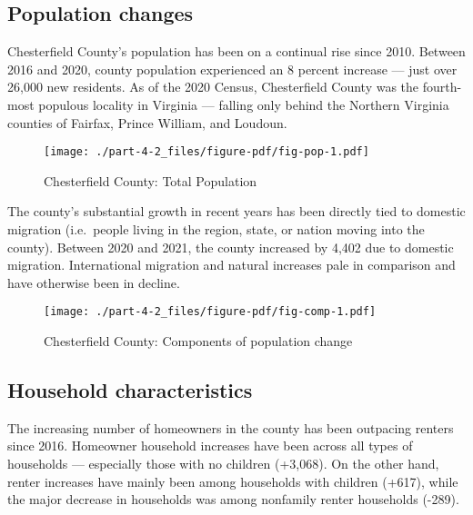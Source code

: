 \documentclass[
  letterpaper,
  DIV=11,
  numbers=noendperiod]{scrreprt}
\begin{document}
\hypertarget{population-changes-1}{%
\subsection{Population changes}\label{population-changes-1}}

Chesterfield County's population has been on a continual rise since
2010. Between 2016 and 2020, county population experienced an 8 percent
increase --- just over 26,000 new residents. As of the 2020 Census,
Chesterfield County was the fourth-most populous locality in Virginia
--- falling only behind the Northern Virginia counties of Fairfax,
Prince William, and Loudoun.

\begin{figure}

{\centering \texttt{[image: ./part-4-2\_files/figure-pdf/fig-pop-1.pdf]}

}

\caption{\label{fig-pop}Chesterfield County: Total Population}

\end{figure}

The county's substantial growth in recent years has been directly tied
to domestic migration (i.e.~people living in the region, state, or
nation moving into the county). Between 2020 and 2021, the county
increased by 4,402 due to domestic migration. International migration
and natural increases pale in comparison and have otherwise been in
decline.

\begin{figure}

{\centering \texttt{[image: ./part-4-2\_files/figure-pdf/fig-comp-1.pdf]}

}

\caption{\label{fig-comp}Chesterfield County: Components of population
change}

\end{figure}

\hypertarget{household-characteristics-1}{%
\subsection{Household
characteristics}\label{household-characteristics-1}}

The increasing number of homeowners in the county has been outpacing
renters since 2016. Homeowner household increases have been across all
types of households --- especially those with no children (+3,068). On
the other hand, renter increases have mainly been among households with
children (+617), while the major decrease in households was among
nonfamily renter households (-289).
\end{document}
